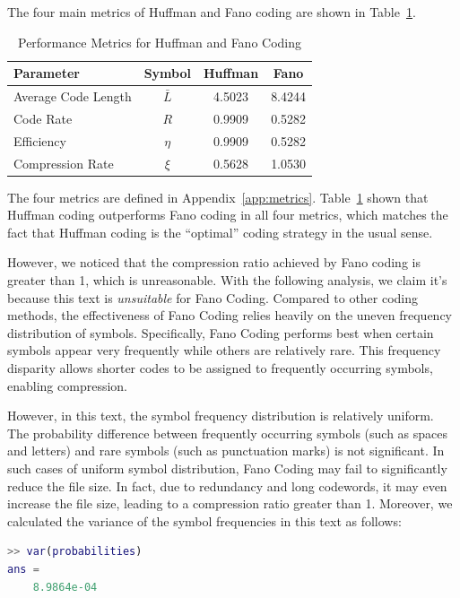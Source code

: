 \documentclass[12pt,twoside]{article}
\begin{document}
The four main metrics of Huffman and Fano coding are shown in Table~\ref{tab:metrics}.

\begin{table}[h!]
    \caption{Performance Metrics for Huffman and Fano Coding}
    \label{tab:metrics}
    \centering
    \begin{tabular}{l|ccc}
    \toprule
    \textbf{Parameter} & \textbf{Symbol} & \textbf{Huffman} & \textbf{Fano} \\ \hline
    Average Code Length & $\bar{L}$ & 4.5023 & 8.4244 \\ 
    Code Rate & $R$ & 0.9909 & 0.5282      \\ 
    Efficiency & $\eta$ & 0.9909 & 0.5282  \\ 
    Compression Rate & $\xi$ & 0.5628 & 1.0530  \\ 
    \bottomrule
    \end{tabular}
\end{table}

The four metrics are defined in Appendix~\ref{app:metrics}. Table~\ref{tab:metrics} shown that Huffman coding outperforms Fano coding in all four metrics, which matches the fact that Huffman coding is the ``optimal'' coding strategy in the usual sense.

However, we noticed that the compression ratio achieved by Fano coding is greater than 1, which is unreasonable. With the following analysis, we claim it's because this text is \textit{unsuitable} for Fano Coding. Compared to other coding methods, the effectiveness of Fano Coding relies heavily on the uneven frequency distribution of symbols. Specifically, Fano Coding performs best when certain symbols appear very frequently while others are relatively rare. This frequency disparity allows shorter codes to be assigned to frequently occurring symbols, enabling compression.

However, in this text, the symbol frequency distribution is relatively uniform. The probability difference between frequently occurring symbols (such as spaces and letters) and rare symbols (such as punctuation marks) is not significant. In such cases of uniform symbol distribution, Fano Coding may fail to significantly reduce the file size. In fact, due to redundancy and long codewords, it may even increase the file size, leading to a compression ratio greater than 1. Moreover, we calculated the variance of the symbol frequencies in this text as follows:

\begin{lstlisting}[language=Matlab, style=custommatlab]
>> var(probabilities)
ans = 
    8.9864e-04
\end{lstlisting}
\end{document}
